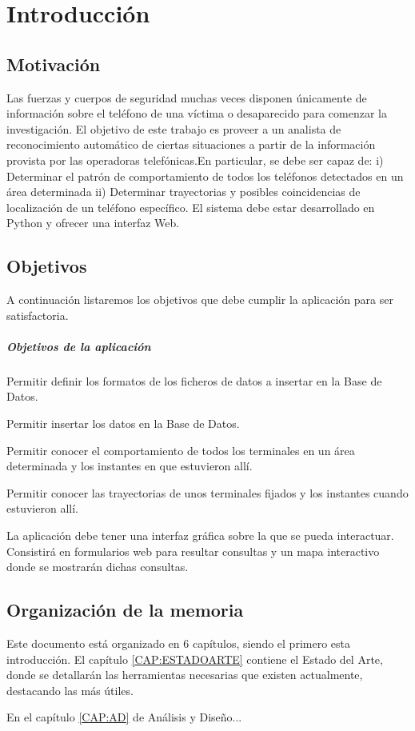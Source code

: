 \chapter{Introducción\label{CAP:INTRODUCCION}}
  \section{Motivación\label{SEC:MOTIVACION}}
    Las fuerzas y cuerpos de seguridad muchas veces disponen únicamente de información sobre el teléfono de una víctima o desaparecido para comenzar la investigación. El objetivo de este trabajo es proveer a un analista de reconocimiento automático de ciertas situaciones a partir de la información provista por las operadoras telefónicas.En particular, se debe ser capaz de:
    i) Determinar el patrón de comportamiento de todos los teléfonos detectados en un área determinada
    ii) Determinar trayectorias y posibles coincidencias de localización de un teléfono específico. 
    El sistema debe estar desarrollado en Python y ofrecer una interfaz Web.
  \section{Objetivos\label{SEC:OBJETIVOS}}
    A continuación listaremos los objetivos que debe cumplir la aplicación para ser satisfactoria.
    \paragraph{Objetivos de la aplicación}
    \begin{objetive}
      \item Permitir definir los formatos de los ficheros de datos a insertar en la Base de Datos.
      \item Permitir insertar los datos en la Base de Datos.
      
      \item Permitir conocer el comportamiento de todos los terminales en un área determinada y los instantes en que estuvieron allí.
      \item Permitir conocer las trayectorias de unos terminales fijados y los instantes cuando estuvieron allí.

      \item La aplicación debe tener una interfaz gráfica sobre la que se pueda interactuar. Consistirá en formularios web para resultar consultas y un mapa interactivo donde se mostrarán dichas consultas.
    \end{objetive}
  
  \section{Organización de la memoria\label{SEC:ORGANIZACION}}
    Este documento está organizado en 6 capítulos, siendo el primero esta introducción. 
    El capítulo \ref{CAP:ESTADOARTE} contiene el Estado del Arte, donde se detallarán las herramientas necesarias que existen actualmente, destacando las más útiles.
    
    En el capítulo \ref{CAP:AD} de Análisis y Diseño...